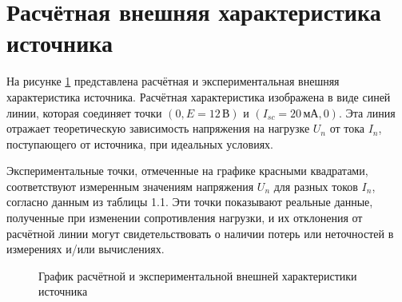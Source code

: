 \newpage
\section{Расчётная внешняя характеристика источника}

На рисунке \ref{fig:characteristic} представлена расчётная и экспериментальная внешняя характеристика источника.
Расчётная характеристика изображена в виде синей линии,
которая соединяет точки \((0, E = 12 \, \text{В})\) и \((I_{sc} = 20 \, \text{мА}, 0)\).
Эта линия отражает теоретическую зависимость напряжения на нагрузке \(U_n\) от тока \(I_n\),
поступающего от источника, при идеальных условиях.

Экспериментальные точки, отмеченные на графике красными квадратами,
соответствуют измеренным значениям напряжения \(U_n\) для разных токов \(I_n\),
согласно данным из таблицы 1.1. Эти точки показывают реальные данные,
полученные при изменении сопротивления нагрузки, и их отклонения от расчётной линии
могут свидетельствовать о наличии потерь или неточностей в измерениях и/или вычислениях.

\begin{figure}[h]
	\centering
	\caption{График расчётной и экспериментальной внешней характеристики источника}
	\label{fig:characteristic}
\end{figure}
